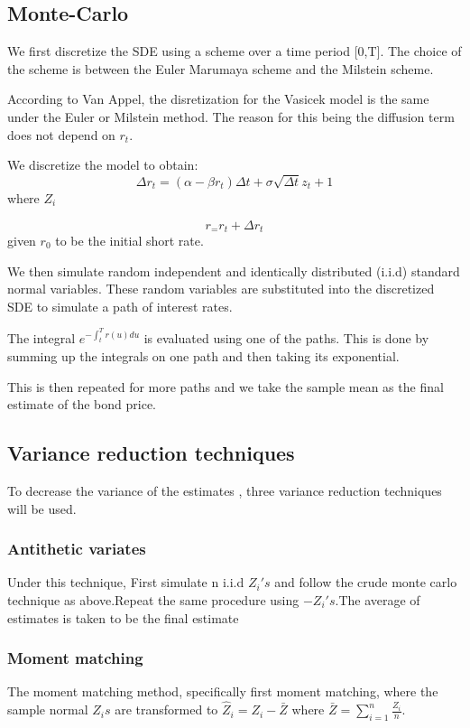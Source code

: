 \documentclass[12pt,a4paper]{article}
\begin{document}
\subsection{Monte-Carlo}

We first discretize the SDE using a scheme over a time period [0,T]. The choice of the scheme is between the Euler Marumaya scheme and the Milstein scheme.
	
According to Van Appel, the disretization for the Vasicek model is the same under the Euler or Milstein method. The reason for this being the diffusion term does not depend on $r_t$.  
	
We discretize the model to obtain:
$$ \Delta r_t= (\alpha-\beta r_t)\Delta t+ \sigma \sqrt{\Delta t} z_t+1$$ where $Z_i$
	
$$r_=r_t+\Delta r_t$$ given $r_0$ to be the initial short rate.
	
We then simulate random independent and identically distributed (i.i.d) standard normal variables. These random variables are substituted into the discretized SDE to simulate a path of interest rates.
	
The integral $e^{-\int_{t}^{T} r(u)du}$ is evaluated using one of the paths. This is done by summing up the integrals on one path and then taking its exponential. 
	
This is then repeated for more paths and we take the sample mean as the final estimate of the bond price.
	 
	 


\subsection{Variance reduction techniques}

To decrease the variance of the estimates , three variance reduction techniques will be used. 


\subsubsection{Antithetic variates}

Under this technique, First simulate n i.i.d $Z_i's$ and follow the crude monte carlo technique as above.Repeat the same procedure using  $-Z_i's$.The average of estimates is taken to be the final estimate 


\subsubsection{Moment matching}
The moment matching method, specifically first moment matching, where the sample normal $Z_{i}s$ are transformed to $\hat{Z}_{i}=Z_{i}-\bar{Z}$ where $\bar{Z}=\sum_{i=1}^{n}\frac{Z_{i}}{n}$.
\end{document}

